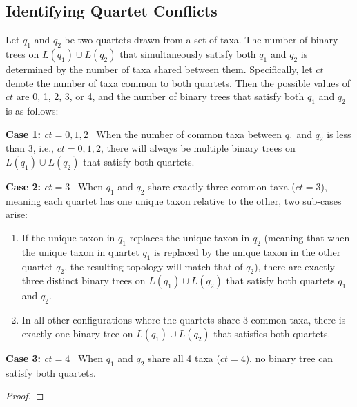 \documentclass[runningheads]{llncs}
\begin{document}
\begin{appendices}

\clearpage
\section{Identifying Quartet Conflicts}
\label{app:quartet-conflict-theory}


\begin{theorem} 
\label{thm:conflict}
Let $q_1$ and $q_2$ be two quartets drawn from a set of taxa. The number of binary trees on $L(q_1) \cup L(q_2)$ that simultaneously satisfy both $q_1$ and $q_2$ is determined by the number of taxa shared between them. Specifically, let $ct$ denote the number of taxa common to both quartets. Then the possible values of $ct$ are 0, 1, 2, 3, or 4, and the number of binary trees that satisfy both $q_1$ and $q_2$ is as follows: 


\textbf{Case 1: $ct = 0, 1, 2$} \ When the number of common taxa between $q_1$ and $q_2$ is less than 3, i.e., $ct = 0, 1, 2$, there will always be multiple binary trees on $L(q_1) \cup L(q_2)$ that satisfy both quartets.

\textbf{Case 2: $ct = 3$} \ When $q_1$ and $q_2$ share exactly three common taxa ($ct = 3$), meaning each quartet has one unique taxon relative to the other, two sub-cases arise: 
    \begin{enumerate} 
        \item If the unique taxon in $q_1$ replaces the unique taxon in $q_2$ (meaning that when the unique taxon in quartet $q_1$ is replaced by the unique taxon in the other quartet $q_2$, the resulting topology will match that of $q_2$), there are exactly three distinct binary trees on $L(q_1) \cup L(q_2)$ that satisfy both quartets $q_1$ and $q_2$.
        \item In all other configurations where the quartets share 3 common taxa, there is exactly one binary tree on $L(q_1) \cup L(q_2)$ that satisfies both quartets. 
    \end{enumerate}

\textbf{Case 3: $ct = 4$} \ When $q_1$ and $q_2$ share all 4 taxa ($ct = 4$), no binary tree can satisfy both quartets. %
\end{theorem}

\begin{proof}


\end{proof}
\end{appendices}
\end{document}
